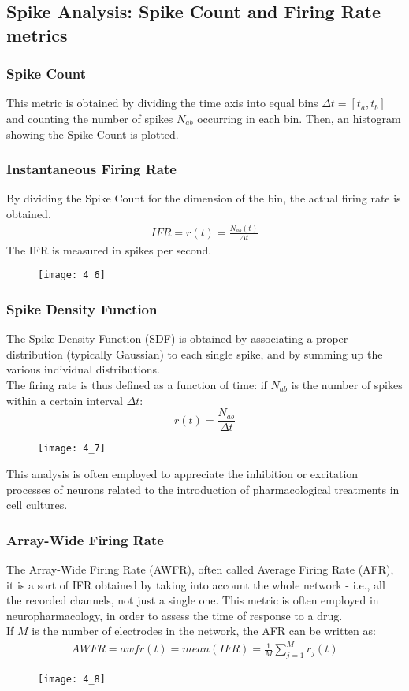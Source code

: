 \subsection{Spike Analysis: Spike Count and Firing Rate metrics}
\subsubsection{Spike Count}
This metric is obtained by dividing the time axis into equal bins \(\Delta{t}=[t_a,t_b]\)
and counting the number of spikes \(N_{ab}\) occurring in each bin. Then, an histogram
showing the Spike Count is plotted.
\subsubsection{Instantaneous Firing Rate}
By dividing the Spike Count for the dimension of the bin, the actual firing rate is obtained.
\begin{align*}
    IFR=r(t)=\frac{N_{ab}(t)}{\Delta{t}}
\end{align*}
The IFR is measured in spikes per second.
\begin{figure}[H]
    \texttt{[image: 4\_6]}
    \centering
\end{figure}
\subsubsection{Spike Density Function}
The Spike Density Function (SDF) is obtained by associating a proper distribution
(typically Gaussian) to each single spike, and by summing up the various individual
distributions.\\
The firing rate is thus defined as a function of time: if \(N_{ab}\) is the number of spikes
within a certain interval \(\Delta t\):
\begin{equation*}
    r(t)=\frac{N_{ab}}{\Delta t}
\end{equation*}
\begin{figure}[H]
    \texttt{[image: 4\_7]}
    \centering
\end{figure}
This analysis is often employed to appreciate the inhibition or excitation processes of
neurons related to the introduction of pharmacological treatments in cell cultures.
\subsubsection{Array-Wide Firing Rate}
The Array-Wide Firing Rate (AWFR), often called Average Firing Rate (AFR), it is a sort of
IFR obtained by taking into account the whole network - i.e., all the recorded channels,
not just a single one. This metric is often employed in neuropharmacology, in order to
assess the time of response to a drug.\\
If \(M\) is the number of electrodes in the network, the AFR can be written as:
\begin{align*}
    AWFR=awfr(t)=mean(IFR)=\frac{1}{M}\sum_{j=1}^{M}r_{j}(t)
\end{align*}
\begin{figure}[H]
    \texttt{[image: 4\_8]}
    \centering
\end{figure}

